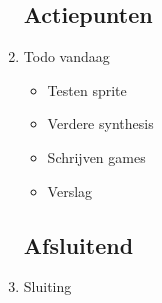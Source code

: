 \documentclass{article}
\begin{document}
\begin{enumerate}
	\subsection*{Actiepunten}
	\item Todo vandaag
	\begin{itemize}
		\item Testen sprite
		\item Verdere synthesis
		\item Schrijven games
		\item Verslag
	\end{itemize}

	\noindent 
	\subsection*{Afsluitend}
	\item Sluiting

\end{enumerate}
\end{document}
